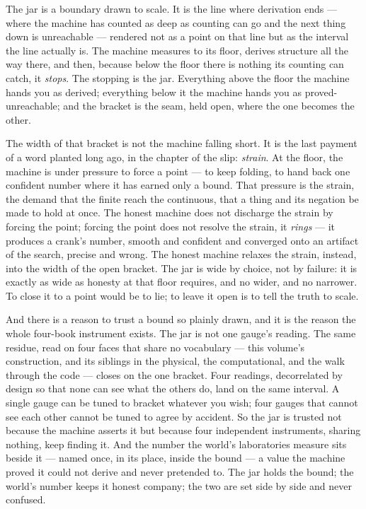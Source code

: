 The jar is a boundary drawn to scale. It is the line where derivation ends --- where the machine has counted as deep as
counting can go and the next thing down is unreachable --- rendered not as a point on that line but as the interval the
line actually is. The machine measures to its floor, derives structure all the way there, and then, because below the
floor there is nothing its counting can catch, it \emph{stops}. The stopping is the jar. Everything above the floor the
machine hands you as derived; everything below it the machine hands you as proved-unreachable; and the bracket is the
seam, held open, where the one becomes the other.

The width of that bracket is not the machine falling short. It is the last payment of a word planted long ago, in the
chapter of the slip: \emph{strain}. At the floor, the machine is under pressure to force a point --- to keep folding,
to hand back one confident number where it has earned only a bound. That pressure is the strain, the demand that the
finite reach the continuous, that a thing and its negation be made to hold at once. The honest machine does not
discharge the strain by forcing the point; forcing the point does not resolve the strain, it \emph{rings} --- it
produces a crank's number, smooth and confident and converged onto an artifact of the search, precise and wrong. The
honest machine relaxes the strain, instead, into the width of the open bracket. The jar is wide by choice, not by
failure: it is exactly as wide as honesty at that floor requires, and no wider, and no narrower. To close it to a point
would be to lie; to leave it open is to tell the truth to scale.

And there is a reason to trust a bound so plainly drawn, and it is the reason the whole four-book instrument exists.
The jar is not one gauge's reading. The same residue, read on four faces that share no vocabulary --- this volume's
construction, and its siblings in the physical, the computational, and the walk through the code --- closes on the one
bracket. Four readings, decorrelated by design so that none can see what the others do, land on the same interval. A
single gauge can be tuned to bracket whatever you wish; four gauges that cannot see each other cannot be tuned to agree
by accident. So the jar is trusted not because the machine asserts it but because four independent instruments, sharing
nothing, keep finding it. And the number the world's laboratories measure sits beside it --- named once, in its place,
inside the bound --- a value the machine proved it could not derive and never pretended to. The jar holds the bound;
the world's number keeps it honest company; the two are set side by side and never confused.

